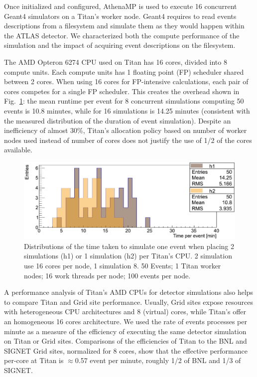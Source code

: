 Once initialized and configured, AthenaMP is used to execute 16 concurrent
Geant4 simulators on a Titan's worker node. Geant4 requires to read events
descriptions from a filesystem and simulate them as they would happen within
the ATLAS detector. We characterized both the compute performance of the
simulation and the impact of acquiring event descriptions on the filesystem.

The AMD Opteron 6274 CPU used on Titan has 16 cores, divided into 8 compute
units. Each compute units has 1 floating point (FP) scheduler shared between
2 cores. When using 16 cores for FP-intensive calculations, each pair of
cores competes for a single FP scheduler. This creates the overhead shown in
Fig.~\ref{fig:comparison-8-16cores}: the mean runtime per event for 8
concurrent simulations computing 50 events is 10.8 minutes, while for 16
simulations is 14.25 minutes (consistent with the measured distribution of
the duration of event simulation). Despite an inefficiency of almost 30\%,
Titan's allocation policy based on number of worker nodes used instead of
number of cores does not justify the use of 1/2 of the cores available.

\begin{figure}[htp]
    \includegraphics[clip,width=\columnwidth]{figures/tx8_tx16_comparison_vsquashed.pdf}
    \vspace{-0.3in}
    \caption{Distributions of the time taken to simulate one event when
    placing 2 simulations (h1) or 1 simulation (h2) per Titan's CPU\@. 2
    simulation use 16 cores per node, 1 simulation 8. 50 Events; 1 Titan
    worker nodes; 16 work threads per node; 100 events per
    node.}\label{fig:comparison-8-16cores}
\end{figure}

A performance analysis of Titan's AMD CPUs for detector simulations also helps
to compare Titan and Grid site performance. Usually, Grid sites expose
resources with heterogeneous CPU architectures and 8 (virtual) cores, while
Titan's offer an homogeneous 16 cores architecture. We used the rate of events
processes per minute as a measure of the efficiency of executing the same
detector simulation on Titan or Grid sites. Comparisons of the efficiencies of
Titan to the BNL and SIGNET Grid sites, normalized for 8 cores, show that the
effective performance per-core at Titan is
\(\approx\)0.57 event per minute, roughly 1/2 of BNL and  1/3 of SIGNET.

